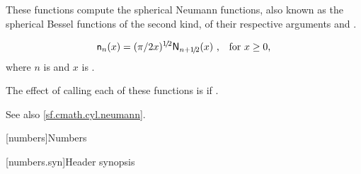 \begin{itemdescr}
\pnum
\effects
These functions compute the spherical Neumann functions,
also known as the spherical Bessel functions of the second kind,
of their respective arguments
 and .

\pnum
\returns
\[ \mathsf{n}_n(x) = (\pi/2x)^{1\!/\!2} \mathsf{N}_{n + 1\!/\!2}(x)
   \text{ ,\quad for $x \ge 0$,} \]
where
$n$ is  and
$x$ is .

\pnum
\remarks
The effect of calling each of these functions
is 
if .

\pnum
See also \ref{sf.cmath.cyl.neumann}.
\end{itemdescr}


[numbers]{Numbers}

[numbers.syn]{Header  synopsis}
%

